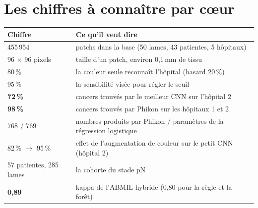 \documentclass[11pt,a4paper]{article}
\begin{document}
\section{Les chiffres à connaître par cœur}\label{sec:chiffres}
\begin{table}[H]
\centering\small
\begin{tabularx}{\textwidth}{lX}
\toprule
\textbf{Chiffre} & \textbf{Ce qu'il veut dire} \\
\midrule
455\,954 & patchs dans la base (50 lames, 43 patientes, 5 hôpitaux) \\
96 × 96 pixels & taille d'un patch, environ 0,1\,mm de tissu \\
80\,\% & la couleur seule reconnaît l'hôpital (hasard 20\,\%) \\
95\,\% & la sensibilité visée pour régler le seuil \\
\textbf{72\,\%} & cancers trouvés par le meilleur CNN sur l'hôpital 2 \\
\textbf{98\,\%} & cancers trouvés par Phikon sur les hôpitaux 1 et 2 \\
768 / 769 & nombres produits par Phikon / paramètres de la régression logistique \\
82\,\% $\to$ 95\,\% & effet de l'augmentation de couleur sur le petit CNN (hôpital 2) \\
57 patientes, 285 lames & la cohorte du stade pN \\
\textbf{0,89} & kappa de l'ABMIL hybride (0,80 pour la règle et la forêt) \\
\bottomrule
\end{tabularx}
\end{table}
\end{document}
